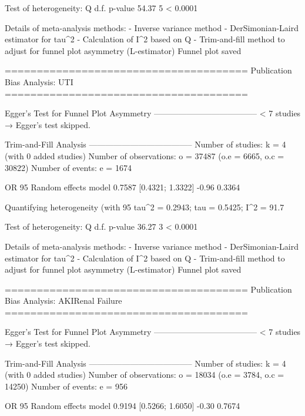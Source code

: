 Test of heterogeneity:
     Q d.f.  p-value
 54.37    5 < 0.0001

Details of meta-analysis methods:
- Inverse variance method
- DerSimonian-Laird estimator for tau^2
- Calculation of I^2 based on Q
- Trim-and-fill method to adjust for funnel plot asymmetry (L-estimator)
  Funnel plot saved

======================================
Publication Bias Analysis: UTI 
======================================
                                                                                                                                                        
Egger's Test for Funnel Plot Asymmetry
--------------------------------------
  < 7 studies → Egger’s test skipped.

Trim-and-Fill Analysis
--------------------------------------
Number of studies: k = 4 (with 0 added studies)
Number of observations: o = 37487 (o.e = 6665, o.c = 30822)
Number of events: e = 1674

                         OR           95%
Random effects model 0.7587 [0.4321; 1.3322] -0.96  0.3364

Quantifying heterogeneity (with 95%
 tau^2 = 0.2943; tau = 0.5425; I^2 = 91.7%

Test of heterogeneity:
     Q d.f.  p-value
 36.27    3 < 0.0001

Details of meta-analysis methods:
- Inverse variance method
- DerSimonian-Laird estimator for tau^2
- Calculation of I^2 based on Q
- Trim-and-fill method to adjust for funnel plot asymmetry (L-estimator)
  Funnel plot saved

======================================
Publication Bias Analysis: AKIRenal Failure 
======================================
                                                                                                                                                        
Egger's Test for Funnel Plot Asymmetry
--------------------------------------
  < 7 studies → Egger’s test skipped.

Trim-and-Fill Analysis
--------------------------------------
Number of studies: k = 4 (with 0 added studies)
Number of observations: o = 18034 (o.e = 3784, o.c = 14250)
Number of events: e = 956

                         OR           95%
Random effects model 0.9194 [0.5266; 1.6050] -0.30  0.7674

